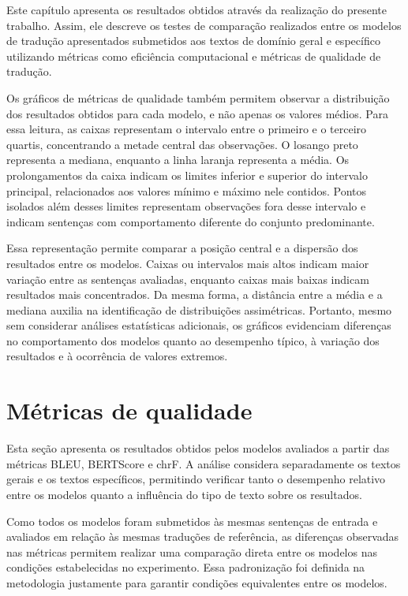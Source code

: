 Este capítulo apresenta os resultados obtidos através da realização do presente trabalho. Assim, ele descreve os testes de comparação realizados entre os modelos de tradução apresentados submetidos aos textos de domínio geral e específico utilizando métricas como eficiência computacional e métricas de qualidade de tradução.



Os gráficos de métricas de qualidade também permitem observar a distribuição dos resultados obtidos para cada modelo, e não apenas os valores médios. Para essa leitura, as caixas representam o intervalo entre o primeiro e o terceiro quartis, concentrando a metade central das observações. O losango preto representa a mediana, enquanto a linha laranja representa a média. Os prolongamentos da caixa indicam os limites inferior e superior do intervalo principal, relacionados aos valores mínimo e máximo nele contidos. Pontos isolados além desses limites representam observações fora desse intervalo e indicam sentenças com comportamento diferente do conjunto predominante.

Essa representação permite comparar a posição central e a dispersão dos resultados entre os modelos. Caixas ou intervalos mais altos indicam maior variação entre as sentenças avaliadas, enquanto caixas mais baixas indicam resultados mais concentrados. Da mesma forma, a distância entre a média e a mediana auxilia na identificação de distribuições assimétricas. Portanto, mesmo sem considerar análises estatísticas adicionais, os gráficos evidenciam diferenças no comportamento dos modelos quanto ao desempenho típico, à variação dos resultados e à ocorrência de valores extremos.

\section{Métricas de qualidade}
Esta seção apresenta os resultados obtidos pelos modelos avaliados a partir das métricas BLEU, BERTScore e chrF. A análise considera separadamente os textos gerais e os textos específicos, permitindo verificar tanto o desempenho relativo entre os modelos quanto a influência do tipo de texto sobre os resultados.

Como todos os modelos foram submetidos às mesmas sentenças de entrada e avaliados em relação às mesmas traduções de referência, as diferenças observadas nas métricas permitem realizar uma comparação direta entre os modelos nas condições estabelecidas no experimento. Essa padronização foi definida na metodologia justamente para garantir condições equivalentes entre os modelos.

